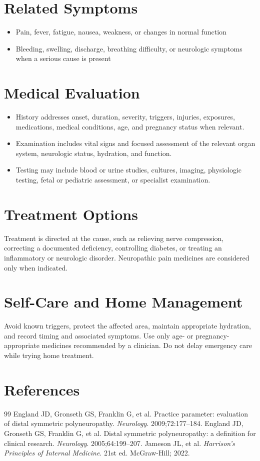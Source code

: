 \section*{Related Symptoms}
\begin{itemize}
  \item Pain, fever, fatigue, nausea, weakness, or changes in normal function
  \item Bleeding, swelling, discharge, breathing difficulty, or neurologic symptoms when a serious cause is present
\end{itemize}

\section*{Medical Evaluation}
\begin{itemize}
  \item History addresses onset, duration, severity, triggers, injuries, exposures, medications, medical conditions, age, and pregnancy status when relevant.
  \item Examination includes vital signs and focused assessment of the relevant organ system, neurologic status, hydration, and function.
  \item Testing may include blood or urine studies, cultures, imaging, physiologic testing, fetal or pediatric assessment, or specialist examination.
\end{itemize}

\section*{Treatment Options}
Treatment is directed at the cause, such as relieving nerve compression, correcting a documented deficiency, controlling diabetes, or treating an inflammatory or neurologic disorder. Neuropathic pain medicines are considered only when indicated.

\section*{Self-Care and Home Management}
Avoid known triggers, protect the affected area, maintain appropriate hydration, and record timing and associated symptoms. Use only age- or pregnancy-appropriate medicines recommended by a clinician. Do not delay emergency care while trying home treatment.

\section*{References}
\begin{thebibliography}{99}
 England JD, Gronseth GS, Franklin G, et al. Practice parameter: evaluation of distal symmetric polyneuropathy. \textit{Neurology}. 2009;72:177--184.
 England JD, Gronseth GS, Franklin G, et al. Distal symmetric polyneuropathy: a definition for clinical research. \textit{Neurology}. 2005;64:199--207.
 Jameson JL, et al. \textit{Harrison's Principles of Internal Medicine}. 21st ed. McGraw-Hill; 2022.
\end{thebibliography}
